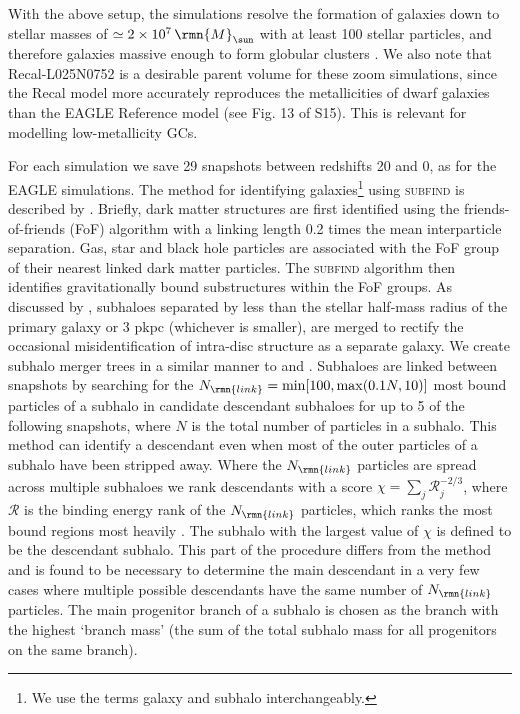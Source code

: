 \documentclass[fleqn,usenatbib]{mnras}
\newcommand\Msun{\,\rmn{M}_{\sun}}
\begin{document}
With the above setup, the simulations resolve the formation of galaxies down to stellar masses of $\simeq 2 \times 10^7 \Msun$ with at least 100 stellar particles, and therefore galaxies massive enough to form globular clusters \citep[a similar mass to the Fornax dSph, one of the lowest mass Local Group galaxies with GCs, e.g.][]{Forbes_et_al_00}. We also note that Recal-L025N0752 is a desirable parent volume for these zoom simulations, since the Recal model more accurately reproduces the metallicities of dwarf galaxies than the EAGLE Reference model (see Fig. 13 of S15). This is relevant for modelling low-metallicity GCs.

For each simulation we save 29 snapshots between redshifts 20 and 0, as for the EAGLE simulations. The method for identifying galaxies\footnote{We use the terms galaxy and subhalo interchangeably.} using \textsc{subfind} \citep{Springel_et_al_01, Dolag_et_al_09} is described by .
Briefly, dark matter structures are first identified using the friends-of-friends (FoF) algorithm \citep{DEFW85} with a linking length 0.2 times the mean interparticle separation. Gas, star and black hole particles are associated with the FoF group of their nearest linked dark matter particles. The \textsc{subfind} algorithm then identifies gravitationally bound substructures within the FoF groups. As discussed by , subhaloes separated by less than the stellar half-mass radius of the primary galaxy or 3 pkpc (whichever is smaller), are merged to rectify the occasional misidentification of intra-disc structure as a separate galaxy. We create subhalo merger trees in a similar manner to \citet{Jiang_et_al_14} and \citet{Qu_et_al_17}. Subhaloes are linked between snapshots by searching for the $N_\rmn{link} = \min[100, \max(0.1 N, 10)]$ most bound particles of a subhalo in candidate descendant subhaloes for up to 5 of the following snapshots, where $N$ is the total number of particles in a subhalo. This method can identify a descendant even when most of the outer particles of a subhalo have been stripped away.
Where the $N_\rmn{link}$ particles are spread across multiple subhaloes we rank descendants with a score $\chi = \sum_j \mathcal{R}_j^{-2/3}$, where $\mathcal{R}$ is the binding energy rank of the $N_\rmn{link}$ particles, which ranks the most bound regions most heavily \citep[similar to][]{Boylan-Kolchin_et_al_09}. The subhalo with the largest value of $\chi$ is defined to be the descendant subhalo. This part of the procedure differs from the \citet{Jiang_et_al_14} method and is found to be necessary to determine the main descendant in a very few cases where multiple possible descendants have the same number of $N_\rmn{link}$ particles. The main progenitor branch of a subhalo is chosen as the branch with the highest `branch mass' (the sum of the total subhalo mass for all progenitors on the same branch).
\end{document}
